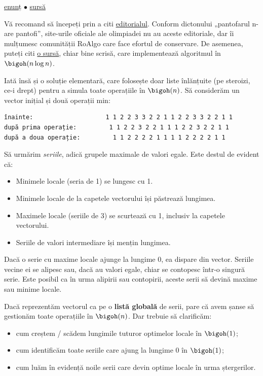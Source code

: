 \href{https://kilonova.ro/problems/3732}{enunț}
$\bullet$
\hyperref[code:tornade]{sursă}

Vă recomand să începeți prin a citi \href{https://github.com/roalgo-discord/Romanian-Olympiad-Solutions/blob/main/Baraj\%20\%2B\%20Lot\%20Seniori\%20(IOI\%20team\%20selection\%20tests)/2025/Editorial\%20baraje\%20ziua\%201\%20\%C8\%99i\%202.pdf}{editorialul}. Conform dictonului „pantofarul n-are pantofi”, site-urile oficiale ale olimpiadei nu au aceste editoriale, dar îi mulțumesc comunității RoAlgo care face efortul de conservare. De asemenea, puteți citi \href{https://kilonova.ro/submissions/722218}{o sursă}, chiar bine scrisă, care implementează algoritmul în $\bigoh(n \log n)$.

Iată însă și o soluție elementară, care folosește doar liste înlănțuite (pe steroizi, ce-i drept) pentru a simula toate operațiile în $\bigoh(n)$. Să considerăm un vector inițial și două operații min:

\begin{verbatim}
înainte:                    1 1 2 2 3 3 2 2 1 1 2 2 3 3 2 2 1 1
după prima operație:         1 1 2 2 3 2 2 1 1 1 2 2 3 2 2 1 1
după a doua operație:         1 1 2 2 2 2 1 1 1 1 2 2 2 2 1 1
\end{verbatim}

Să urmărim \textit{seriile}, adică grupele maximale de valori egale. Este destul de evident că:

\begin{itemize}
  \item Minimele locale (seria de 1) se lungesc cu 1.
  \item Minimele locale de la capetele vectorului își păstrează lungimea.
  \item Maximele locale (seriile de 3) se scurtează cu 1, inclusiv la capetele vectorului.
  \item Seriile de valori intermediare își mențin lungimea.
\end{itemize}

Dacă o serie cu maxime locale ajunge la lungime 0, ea dispare din vector. Seriile vecine ei se alipesc sau, dacă au valori egale, chiar se contopesc într-o singură serie. Este posibil ca în urma alipirii sau contopirii, aceste serii să devină maxime sau minime locale.

Dacă reprezentăm vectorul ca pe o \textbf{listă globală} de serii, pare că avem șanse să gestionăm toate operațiile în $\bigoh(n)$. Dar trebuie să clarificăm:

\begin{itemize}
  \item cum creștem / scădem lungimile tuturor optimelor locale în $\bigoh(1)$;
  \item cum identificăm toate seriile care ajung la lungime 0 în $\bigoh(1)$;
  \item cum luăm în evidență noile serii care devin optime locale în urma ștergerilor.
\end{itemize}


